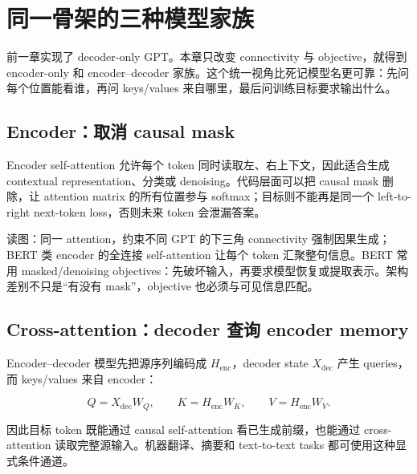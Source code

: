 \section{同一骨架的三种模型家族}

前一章实现了 decoder-only GPT。本章只改变 connectivity 与 objective，就得到 encoder-only 和 encoder--decoder 家族。这个统一视角比死记模型名更可靠：先问每个位置能看谁，再问 keys/values 来自哪里，最后问训练目标要求输出什么。

\subsection{Encoder：取消 causal mask}

Encoder self-attention 允许每个 token 同时读取左、右上下文，因此适合生成 contextual representation、分类或 denoising。代码层面可以把 causal mask 删除，让 attention matrix 的所有位置参与 softmax；目标则不能再是同一个 left-to-right next-token loss，否则未来 token 会泄漏答案。


\begin{knowledgebox}{读图：同一 attention，约束不同}
GPT 的下三角 connectivity 强制因果生成；BERT 类 encoder 的全连接 self-attention 让每个 token 汇聚整句信息。BERT 常用 masked/denoising objectives：先破坏输入，再要求模型恢复或提取表示。架构差别不只是“有没有 mask”，objective 也必须与可见信息匹配。
\end{knowledgebox}

\subsection{Cross-attention：decoder 查询 encoder memory}

Encoder--decoder 模型先把源序列编码成 $H_{\text{enc}}$，decoder state $X_{\text{dec}}$ 产生 queries，而 keys/values 来自 encoder：

\[
Q=X_{\text{dec}}W_Q,\qquad
K=H_{\text{enc}}W_K,\qquad
V=H_{\text{enc}}W_V.
\]

因此目标 token 既能通过 causal self-attention 看已生成前缀，也能通过 cross-attention 读取完整源输入。机器翻译、摘要和 text-to-text tasks 都可使用这种显式条件通道。


